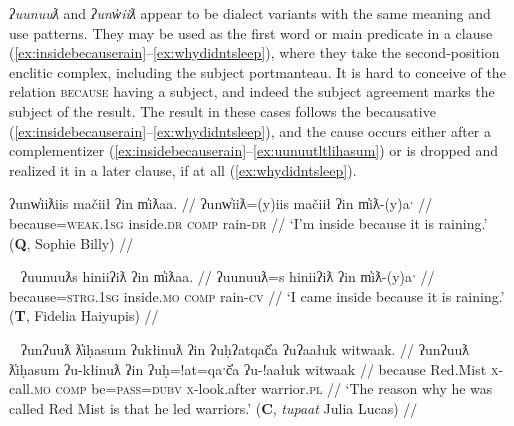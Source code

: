 \textit{ʔuunuuƛ} and \textit{ʔunw̓iiƛ} appear to be dialect variants with the same meaning and use patterns. They may be used as the first word or main predicate in a clause (\ref{ex:insidebecauserain}--\ref{ex:whydidntsleep}), where they take the second-position enclitic complex, including the subject portmanteau. It is hard to conceive of the relation {\textsc{because}} having a subject, and indeed the subject agreement marks the subject of the result. The result in these cases follows the becausative (\ref{ex:insidebecauserain}--\ref{ex:whydidntsleep}), and the cause occurs either after a complementizer (\ref{ex:insidebecauserain}--\ref{ex:uunuutltlihasum}) or is dropped and realized it in a later clause, if at all (\ref{ex:whydidntsleep}).

\begin{comment}
\ex \label{ex:uunuutl0}
\begingl
\glpreamble wiiksinḥimaḥ teʔiłšiƛ ʔuunuuƛ wałaakqas c̓uumuʕas. //
\gla wik-L.sinḥi=(m)aˑḥ teʔił-šiƛ ʔuunuuƛ wałaak=qaˑs c̓uumuʕas //
\glb \textsc{neg}-try.to.do=\textsc{real.1sg} sick.\textsc{dr}-\textsc{mo} because go.\textsc{dr}=\textsc{defn.1sg} Port.Alberni //
\glft `I’m trying not to get sick because I am going to Port Alberni.' (\textbf{B}, Bob Mundy) //
\endgl
\xe
\end{comment}


\ex \label{ex:insidebecauserain}
\begingl
\glpreamble ʔunw̓iiƛiis mačiił ʔin m̓iƛaa. //
\gla ʔunw̓iiƛ=(y)iis mačiił ʔin m̓iƛ-(y)aˑ //
\glb because=\textsc{weak.1sg} inside.\textsc{dr} \textsc{comp} rain-\textsc{dr} //
\glft `I'm inside because it is raining.' (\textbf{Q}, Sophie Billy) //
\endgl
\xe

\ex~ \label{ex:inisidebecauserain2}
\begingl
\glpreamble ʔuunuuƛs hiniiʔiƛ ʔin m̓iƛaa. //
\gla ʔuunuuƛ=s hiniiʔiƛ ʔin m̓iƛ-(y)aˑ //
\glb because=\textsc{strg.1sg} inside.\textsc{mo} \textsc{comp} rain-\textsc{cv} //
\glft `I came inside because it is raining.' (\textbf{T}, Fidelia Haiyupis) //
\endgl
\xe

\ex~ \label{ex:uunuutltlihasum}
\begingl
\glpreamble ʔunʔuuƛ ƛ̓iḥasum ʔukłinuƛ ʔin ʔuḥʔatqač̓a ʔuʔaałuk witwaak. //
\gla ʔunʔuuƛ ƛ̓iḥasum ʔu-kłinuƛ ʔin ʔuḥ=!at=qaˑč̓a ʔu-!aałuk witwaak //
\glb because Red.Mist \textsc{x}-call.\textsc{mo} \textsc{comp} be=\textsc{pass}=\textsc{dubv} \textsc{x}-look.after warrior.\textsc{pl} //
\glft `The reason why he was called Red Mist is that he led warriors.' (\textbf{C}, \textit{tupaat} Julia Lucas) //
\endgl
\xe


